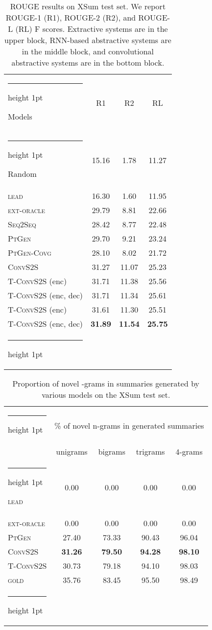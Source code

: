 \documentclass[11pt,a4paper]{article}
\makeatletter
\newcommand{\thickhline}{\noalign {\ifnum 0=`}\fi \hrule height 1pt
    \futurelet \reserved@a \@xhline
}
\makeatother
\begin{document}
\begin{table}[t]
  \begin{center}{\fontsize{8.5}{11}\selectfont \begin{tabular}{ l | c c c }
    \thickhline
    Models & R1 & R2 & RL \\ \thickhline
Random & 15.16 & 1.78 & 11.27 \\ 
    \textsc{lead} & 16.30 & 1.60 & 11.95 \\ 
    \textsc{ext-oracle} & 29.79 & 8.81 & 22.66 \\ \hline
    \textsc{Seq2Seq} &  28.42 & 8.77 &  22.48 \\
    \textsc{PtGen} & 29.70 & 9.21 & 23.24 \\ 
    \textsc{PtGen-Covg} & 28.10 & 8.02 & 21.72 \\ 
\hline
    \textsc{ConvS2S} & 31.27 & 11.07 & 25.23 \\  \textsc{T-ConvS2S} (enc) & 31.71 & 11.38 & 25.56 \\
    \textsc{T-ConvS2S} (enc, dec) & 31.71 & 11.34 & 25.61 \\
    \textsc{T-ConvS2S} (enc) & 31.61 & 11.30 & 25.51 \\
    \textsc{T-ConvS2S} (enc, dec)  & \textbf{31.89} & \textbf{11.54} & \textbf{25.75} \\ \thickhline 

\end{tabular}
  }\end{center}
\caption{ROUGE results on  XSum test set. We report \mbox{ROUGE-1} (R1), ROUGE-2
  (R2), and ROUGE-L (RL) F  scores. Extractive systems are in the
  upper block, RNN-based   abstractive systems are in the middle block,
  and convolutional    abstractive systems are in the bottom
  block. \label{tab:rouge}} 
\end{table}

\begin{table}
  \begin{center}{\fontsize{8.5}{11}\selectfont \begin{tabular}{ l | c c c c } 
    \thickhline
    \multirow{2}{*}{Models} & \multicolumn{4}{c}{\% of novel n-grams in generated summaries}  \\
    & unigrams & bigrams & trigrams & 4-grams  \\ \thickhline 
    \textsc{lead} & 0.00 & 0.00 & 0.00 & 0.00 \\
    \textsc{ext-oracle} & 0.00 & 0.00 & 0.00 & 0.00 \\
\textsc{PtGen} & 27.40 & 73.33 & 90.43 & 96.04 \\ 
\textsc{ConvS2S} & \textbf{31.26} & \textbf{79.50} & \textbf{94.28} & \textbf{98.10}\\
    \textsc{T-ConvS2S}  & 30.73 & 79.18 & 94.10 & 98.03 \\ \hline
    \textsc{gold} & 35.76 & 83.45  & 95.50  & 98.49 \\ \thickhline
  \end{tabular}}
  \end{center}
  \caption{Proportion of novel -grams in summaries generated by various models on the XSum test set.
    \label{tab:novelngram-xsum-models}}
\end{table}
\end{document}
